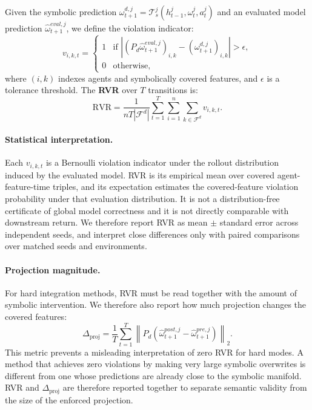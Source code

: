 \documentclass{article}
\theoremstyle{plain}
\theoremstyle{definition}
\theoremstyle{remark}
\begin{document}
Given the symbolic prediction
$\omega^{d,j}_{t+1} = \mathcal{T}^j_s(h^j_{t-1}, \omega^j_t, a^j_t)$
and an evaluated model prediction $\hat{\omega}^{eval,j}_{t+1}$, we define the violation indicator:
\begin{equation}
  v_{i,k,t} =
  \begin{cases}
    1 & \text{if } \left| (P_d\hat{\omega}^{eval,j}_{t+1})_{i,k} - (\omega^{d,j}_{t+1})_{i,k} \right| > \epsilon, \\
    0 & \text{otherwise},
  \end{cases}
  \label{eq:rvr_indicator}
\end{equation}
where $(i,k)$ indexes agents and symbolically covered features, and $\epsilon$ is a tolerance threshold.
%
The \textbf{RVR} over $T$ transitions is:
\begin{equation}
  \text{RVR} =
  \frac{1}{n T |\mathcal{F}^d|}
  \sum_{t=1}^T \sum_{i=1}^n \sum_{k \in \mathcal{F}^d} v_{i,k,t}.
  \label{eq:rvr}
\end{equation}

\paragraph{Statistical interpretation.}
Each $v_{i,k,t}$ is a Bernoulli violation indicator under the rollout distribution induced by the evaluated model. RVR is its empirical mean over covered agent-feature-time triples, and its expectation estimates the covered-feature violation probability under that evaluation distribution. It is not a distribution-free certificate of global model correctness and it is not directly comparable with downstream return. We therefore report RVR as mean $\pm$ standard error across independent seeds, and interpret close differences only with paired comparisons over matched seeds and environments.

\paragraph{Projection magnitude.}
For hard integration methods, RVR must be read together with the amount of symbolic intervention. We therefore also report how much projection changes the covered features:
\begin{equation}
  \Delta_{\mathrm{proj}} =
  \frac{1}{T}
  \sum_{t=1}^{T}
  \left\|
  P_d\left(\hat{\omega}^{post,j}_{t+1} - \hat{\omega}^{pre,j}_{t+1}\right)
  \right\|_2 .
  \label{eq:projection_magnitude}
\end{equation}
This metric prevents a misleading interpretation of zero RVR for hard modes. A method that achieves zero violations by making very large symbolic overwrites is different from one whose predictions are already close to the symbolic manifold. RVR and $\Delta_{\mathrm{proj}}$ are therefore reported together to separate semantic validity from the size of the enforced projection.
\end{document}
